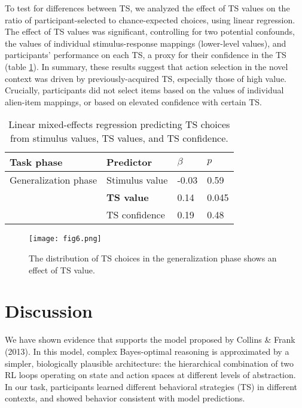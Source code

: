 \documentclass[10pt, letterpaper]{article}
\begin{document}
To test for differences between TS, we analyzed the effect of TS values on the ratio of participant-selected to chance-expected choices, using linear regression. The effect of TS values was significant, controlling for two potential confounds, the values of individual stimulus-response mappings (lower-level values), and participants' performance on each TS, a proxy for their confidence in the TS (table \ref{table:TS creation}). In summary, these results suggest that action selection in the novel context was driven by previously-acquired TS, especially those of high value. Crucially, participants did not select items based on the values of individual alien-item mappings, or based on elevated confidence with certain TS. 

\begin{table}[!ht]
\begin{center} 
\caption{Linear mixed-effects regression predicting TS choices from stimulus values, TS values, and TS confidence.} 
\label{table:TS creation} 
\vskip 0.1in
\small{
\begin{tabular}{llll} 
\hline
Task phase          &   Predictor               &   $\beta$ &   $p$   \\
\hline
Generalization phase&   Stimulus value          &   -0.03   &   0.59  \\
                    &   {\bf TS value}          &   0.14    &   0.045 \\
                    &   TS confidence           &   0.19    &   0.48  \\
\hline
\end{tabular}
}
\end{center} 
\end{table}

\begin{figure}[ht]
    \begin{center}
	\texttt{[image: fig6.png]}
    \end{center}
    \caption{The distribution of TS choices in the generalization phase shows an effect of TS value.}
    \label{figure:TS creation distribution}
\end{figure}

\section{Discussion}

We have shown evidence that supports the model proposed by Collins \& Frank (2013). In this model, complex Bayes-optimal reasoning is approximated by a simpler, biologically plausible architecture: the hierarchical combination of two RL loops operating on state and action spaces at different levels of abstraction. In our task, participants learned different behavioral strategies (TS) in different contexts, and showed behavior consistent with model predictions.
\end{document}
